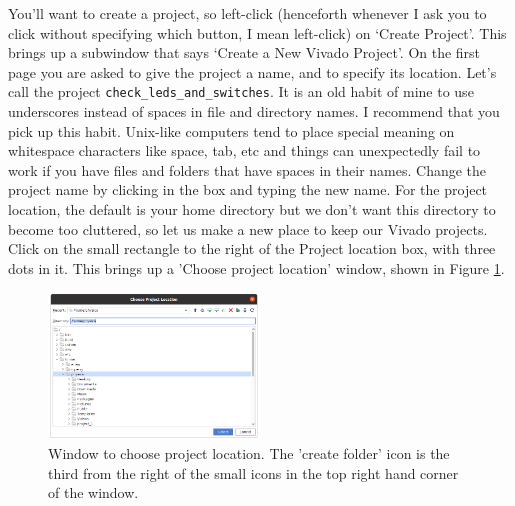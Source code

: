 \documentclass[../physical_computing.tex]{subfiles}
\begin{document}
You'll want to create a project, so left-click (henceforth whenever I ask you to click without specifying which button, I mean left-click) on `Create Project'. This brings up a subwindow that says `Create a New Vivado Project'. On the first page you are asked to give the project a name, and to specify its location. Let's call the project \texttt{check\_leds\_and\_switches}. It is an old habit of mine to use underscores instead of spaces in file and directory names. I recommend that you pick up this habit. Unix-like computers tend to place special meaning on whitespace characters like space, tab, etc and things can unexpectedly fail to work if you have files and folders that have spaces in their names. Change the project name by clicking in the box and typing the new name. For the project location, the default is your home directory but we don't want this directory to become too cluttered, so let us make a new place to keep our Vivado projects. Click on the small rectangle to the right of the Project location box, with three dots in it. This brings up a 'Choose project location' window, shown in Figure \ref{fig:choose_project_location}. 

\begin{figure}[htbp]
    \centering
    \includegraphics[width=0.5\textwidth]{chapter_1/figures/choose_project_location.png}
    \caption{Window to choose project location. The 'create folder' icon is the third from the right of the small icons in the top right hand corner of the window.}
    \label{fig:choose_project_location}
\end{figure}
\end{document}
